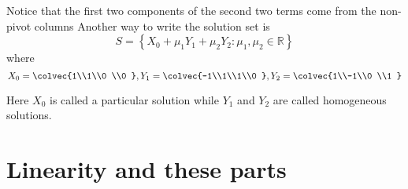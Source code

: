 \begin{example}
Notice that the first two components of the second two terms come from the non-pivot columns
Another way to write the solution set is
\[S= \left\{  X_0 + \mu_1 Y_1 + \mu_2 Y_2   : \mu_1,\mu_2 \in  {\mathbb R}   \right\} \]
where 
\[X_0= \colvec{1\\1\\0 \\0 }, Y_1=\colvec{-1\\1\\1\\0 } , Y_2= \colvec{1\\-1\\0 \\1 }
\]
\end{example}
Here $X_0$ is called a particular solution while $Y_1$ and $Y_2$ are called homogeneous solutions. 



\section{Linearity and these parts}
%

